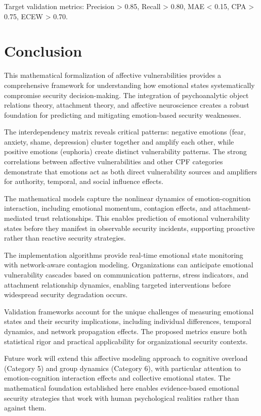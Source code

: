 \documentclass[11pt,a4paper]{article}
\begin{document}
Target validation metrics: Precision > 0.85, Recall > 0.80, MAE < 0.15, CPA > 0.75, ECEW > 0.70.

\section{Conclusion}

This mathematical formalization of affective vulnerabilities provides a comprehensive framework for understanding how emotional states systematically compromise security decision-making. The integration of psychoanalytic object relations theory, attachment theory, and affective neuroscience creates a robust foundation for predicting and mitigating emotion-based security weaknesses.

The interdependency matrix reveals critical patterns: negative emotions (fear, anxiety, shame, depression) cluster together and amplify each other, while positive emotions (euphoria) create distinct vulnerability patterns. The strong correlations between affective vulnerabilities and other CPF categories demonstrate that emotions act as both direct vulnerability sources and amplifiers for authority, temporal, and social influence effects.

The mathematical models capture the nonlinear dynamics of emotion-cognition interaction, including emotional momentum, contagion effects, and attachment-mediated trust relationships. This enables prediction of emotional vulnerability states before they manifest in observable security incidents, supporting proactive rather than reactive security strategies.

The implementation algorithms provide real-time emotional state monitoring with network-aware contagion modeling. Organizations can anticipate emotional vulnerability cascades based on communication patterns, stress indicators, and attachment relationship dynamics, enabling targeted interventions before widespread security degradation occurs.

Validation frameworks account for the unique challenges of measuring emotional states and their security implications, including individual differences, temporal dynamics, and network propagation effects. The proposed metrics ensure both statistical rigor and practical applicability for organizational security contexts.

Future work will extend this affective modeling approach to cognitive overload (Category 5) and group dynamics (Category 6), with particular attention to emotion-cognition interaction effects and collective emotional states. The mathematical foundation established here enables evidence-based emotional security strategies that work with human psychological realities rather than against them.
\end{document}
